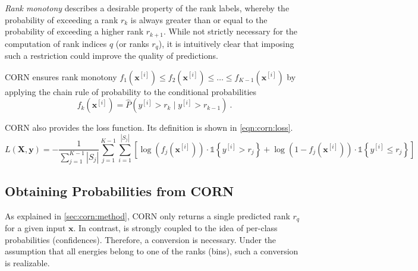 \emph{Rank monotony} describes a desirable property of the rank labels,
whereby the probability of exceeding a rank $r_k$ is always greater than or equal to the probability of exceeding a higher rank $r_{k+1}$.
%
While not strictly necessary for the computation of rank indices $q$ (or ranks $r_q$),
it is intuitively clear that imposing such a restriction could improve the quality of predictions.

\Ac{CORN} ensures rank monotony
  $f_1(\mathbf{x}^{[i]}) \leq f_2(\mathbf{x}^{[i]}) \leq \ldots \leq f_{K-1}(\mathbf{x}^{[i]})$
by applying the chain rule of probability
to the conditional probabilities
\begin{equation}
  f_k(\mathbf{x}^{[i]}) = \hat{P}\left( y^{[i]} > r_k \mid y^{[i]} > r_{k-1} \right) \ .
\end{equation}




\Ac{CORN} also provides the loss function.
Its definition is shown in \autoref{eqn:corn:loss}.
\begin{equation}
  \label{eqn:corn:loss}
  L(\mathbf{X}, \mathbf{y}) =
  - \frac{1}{\sum_{j=1}^{K-1} |S_j|}
  \sum_{j=1}^{K-1}
  \sum_{i=1}^{|S_j|}
  \left[
    \log(f_j(\mathbf{x}^{[i]})) · \mathbb{1}\left\{y^{[i]} > r_j\right\}
    +
    \log(1 - f_j(\mathbf{x}^{[i]})) · \mathbb{1}\left\{y^{[i]} \leq r_j\right\}
  \right]
\end{equation}


\subsection{Obtaining Probabilities from CORN} \label{sec:ordinal:corn:probas}
As explained in \autoref{sec:corn:method},
\Ac{CORN} only returns a single predicted rank $r_q$ for a given input $\mathbf{x}$.
In contrast,
\dsea{} is strongly coupled to the idea of per-class probabilities (confidences).
Therefore, a conversion is necessary.
Under the assumption that all energies belong to one of the ranks (bins),
such a conversion is realizable.

